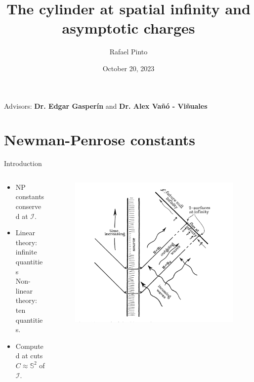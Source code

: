 \documentclass{beamer}
\title[Spin-0 fields NP constants]{The cylinder at spatial infinity and asymptotic charges}
\author[Rafael Pinto]{Rafael Pinto}
\institute[CENTRA-GRIT]{Instituto Superior Técnico}
\date{October 20, 2023}
\theoremstyle{remark}
\theoremstyle{plain}
\theoremstyle{plain}
\begin{document}
\begin{frame}
  \titlepage
  \vfill
  \begin{center}
    Advisors: \textbf{Dr. Edgar Gasper\'in} and \textbf{Dr. Alex Va\~{n}\'o - Vi\~{n}uales}
  \end{center}
\end{frame}

\section{Newman-Penrose constants}
\begin{frame}{Introduction}
  \begin{columns}
    \begin{column}{0.5\textwidth}
      \begin{itemize}
      \item NP constants conserved at $\mathscr{I}$.
      \vspace{7mm}
      \item Linear theory: infinite quantities \\
      Non-linear theory: ten quantities.
      \vspace{5mm}
      \item Computed at cuts ${C} \approx \mathbb{S}^2$ of $\mathscr{I}$.
    \end{itemize}
  \end{column}
  \begin{column}{0.5\textwidth}
    \vspace*{-.8em} %
    \hfill
    \begin{figure}[h]
      \includegraphics[width=1.2\textwidth]{penrose constants.png} 
    \end{figure}
  \end{column}
\end{columns}
\end{frame}
\end{document}
